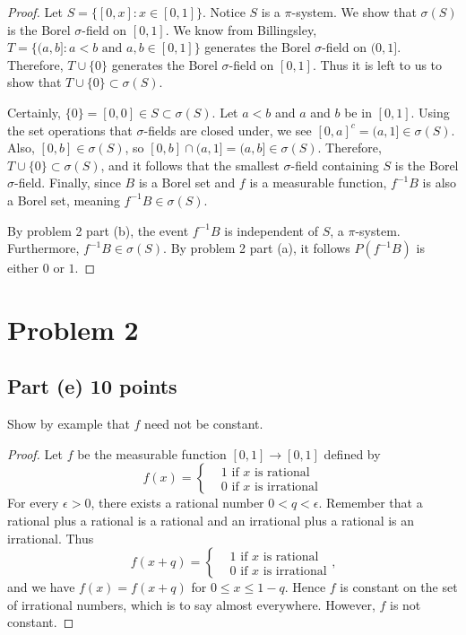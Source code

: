 \documentclass[letterpaper, 12pt]{article}
\begin{document}
\begin{proof}
Let $S = \{[0,x] : x \in [0,1]\}$. Notice $S$ is a $\pi$-system. We show that $\sigma(S)$ is the Borel $\sigma$-field on $[0,1]$. 
We know from Billingsley, $T = \{(a,b] : a<b \text{ and } a,b \in [0,1] \}$ generates the Borel $\sigma$-field on $(0,1]$. 
Therefore, $T \cup \{0\}$ generates the Borel $\sigma$-field on $[0,1]$. 
Thus it is left to us to show that $T \cup \{0\} \subset \sigma(S)$.

Certainly, $\{0\} = [0,0] \in S \subset \sigma(S)$. 
Let $a < b$ and $a$ and $b$ be in $[0,1]$. 
Using the set operations that $\sigma$-fields are closed under, we see $[0,a]^c = (a,1] \in \sigma(S)$. 
Also, $[0,b] \in \sigma(S)$, so $[0,b] \cap (a,1] = (a,b] \in \sigma(S)$.
Therefore, $T \cup \{0\} \subset \sigma(S)$, and it follows that the smallest $\sigma$-field containing $S$ is the Borel $\sigma$-field. Finally, since $B$ is a Borel set and $f$ is a measurable function, $f^{-1}B$ is also a Borel set, meaning $f^{-1}B \in \sigma(S)$.

By problem 2 part (b), the event $f^{-1}B$ is independent of $S$, a $\pi$-system. Furthermore, $f^{-1}B \in \sigma(S)$. By problem 2 part (a), it follows $P(f^{-1}B)$ is either $0$ or $1$.
\end{proof}

\pagebreak

\section*{Problem 2}
\subsection*{Part (e) 10 points}
Show by example that $f$ need not be constant.

\begin{proof}
Let $f$ be the measurable function $[0,1] \to [0,1]$ defined by 
\[
f(x) =
\begin{cases}
&1 \text{ if $x$ is rational} \\
&0 \text{ if $x$ is irrational} 
\end{cases}
\]
For every $\epsilon > 0$, there exists a rational number $0 < q < \epsilon$. Remember that a rational plus a rational is a rational and an irrational plus a rational is an irrational. Thus
\[
f(x + q) =
\begin{cases}
&1 \text{ if $x$ is rational} \\
&0 \text{ if $x$ is irrational}
\end{cases}
\text{,}
\]
and we have $f(x) = f(x+q)$ for $0 \leq x \leq 1 - q$. Hence $f$ is constant on the set of irrational numbers, which is to say almost everywhere. However, $f$ is not constant.
\end{proof}
\end{document}
